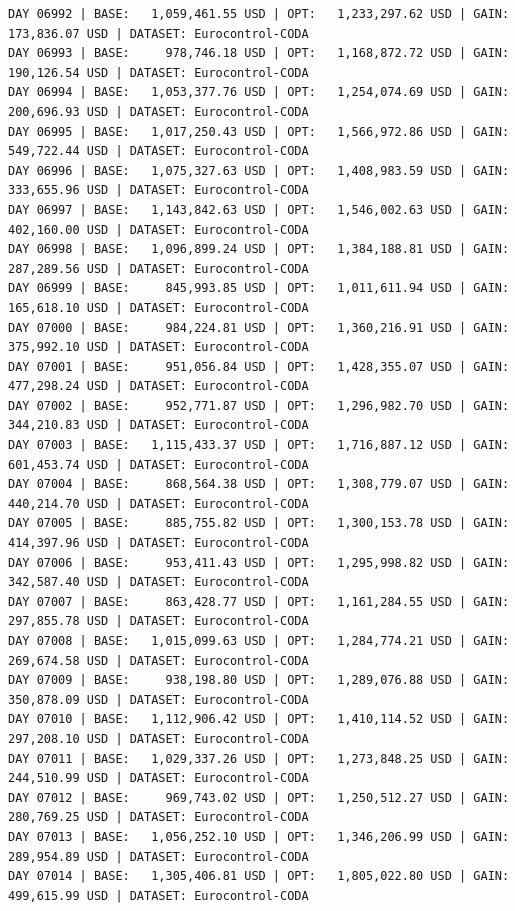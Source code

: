 \documentclass[11pt,a4paper]{article}
\begin{document}
\begin{verbatim}
DAY 06992 | BASE:   1,059,461.55 USD | OPT:   1,233,297.62 USD | GAIN: 173,836.07 USD | DATASET: Eurocontrol-CODA
DAY 06993 | BASE:     978,746.18 USD | OPT:   1,168,872.72 USD | GAIN: 190,126.54 USD | DATASET: Eurocontrol-CODA
DAY 06994 | BASE:   1,053,377.76 USD | OPT:   1,254,074.69 USD | GAIN: 200,696.93 USD | DATASET: Eurocontrol-CODA
DAY 06995 | BASE:   1,017,250.43 USD | OPT:   1,566,972.86 USD | GAIN: 549,722.44 USD | DATASET: Eurocontrol-CODA
DAY 06996 | BASE:   1,075,327.63 USD | OPT:   1,408,983.59 USD | GAIN: 333,655.96 USD | DATASET: Eurocontrol-CODA
DAY 06997 | BASE:   1,143,842.63 USD | OPT:   1,546,002.63 USD | GAIN: 402,160.00 USD | DATASET: Eurocontrol-CODA
DAY 06998 | BASE:   1,096,899.24 USD | OPT:   1,384,188.81 USD | GAIN: 287,289.56 USD | DATASET: Eurocontrol-CODA
DAY 06999 | BASE:     845,993.85 USD | OPT:   1,011,611.94 USD | GAIN: 165,618.10 USD | DATASET: Eurocontrol-CODA
DAY 07000 | BASE:     984,224.81 USD | OPT:   1,360,216.91 USD | GAIN: 375,992.10 USD | DATASET: Eurocontrol-CODA
DAY 07001 | BASE:     951,056.84 USD | OPT:   1,428,355.07 USD | GAIN: 477,298.24 USD | DATASET: Eurocontrol-CODA
DAY 07002 | BASE:     952,771.87 USD | OPT:   1,296,982.70 USD | GAIN: 344,210.83 USD | DATASET: Eurocontrol-CODA
DAY 07003 | BASE:   1,115,433.37 USD | OPT:   1,716,887.12 USD | GAIN: 601,453.74 USD | DATASET: Eurocontrol-CODA
DAY 07004 | BASE:     868,564.38 USD | OPT:   1,308,779.07 USD | GAIN: 440,214.70 USD | DATASET: Eurocontrol-CODA
DAY 07005 | BASE:     885,755.82 USD | OPT:   1,300,153.78 USD | GAIN: 414,397.96 USD | DATASET: Eurocontrol-CODA
DAY 07006 | BASE:     953,411.43 USD | OPT:   1,295,998.82 USD | GAIN: 342,587.40 USD | DATASET: Eurocontrol-CODA
DAY 07007 | BASE:     863,428.77 USD | OPT:   1,161,284.55 USD | GAIN: 297,855.78 USD | DATASET: Eurocontrol-CODA
DAY 07008 | BASE:   1,015,099.63 USD | OPT:   1,284,774.21 USD | GAIN: 269,674.58 USD | DATASET: Eurocontrol-CODA
DAY 07009 | BASE:     938,198.80 USD | OPT:   1,289,076.88 USD | GAIN: 350,878.09 USD | DATASET: Eurocontrol-CODA
DAY 07010 | BASE:   1,112,906.42 USD | OPT:   1,410,114.52 USD | GAIN: 297,208.10 USD | DATASET: Eurocontrol-CODA
DAY 07011 | BASE:   1,029,337.26 USD | OPT:   1,273,848.25 USD | GAIN: 244,510.99 USD | DATASET: Eurocontrol-CODA
DAY 07012 | BASE:     969,743.02 USD | OPT:   1,250,512.27 USD | GAIN: 280,769.25 USD | DATASET: Eurocontrol-CODA
DAY 07013 | BASE:   1,056,252.10 USD | OPT:   1,346,206.99 USD | GAIN: 289,954.89 USD | DATASET: Eurocontrol-CODA
DAY 07014 | BASE:   1,305,406.81 USD | OPT:   1,805,022.80 USD | GAIN: 499,615.99 USD | DATASET: Eurocontrol-CODA

\end{verbatim}
\end{document}
